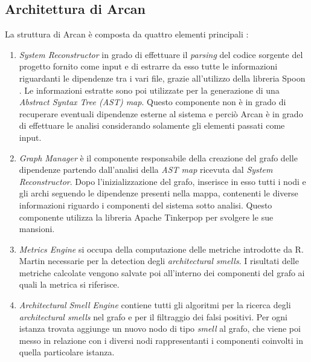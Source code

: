     \subsection{Architettura di Arcan}
        La struttura di Arcan è composta da quattro elementi principali \cite{Arcan2017}:
        \begin{enumerate}
            \item \textit{System Reconstructor} in grado di effettuare il \textit{parsing} del codice sorgente del progetto fornito come input e di estrarre da esso tutte le informazioni riguardanti le dipendenze tra i vari file, grazie all'utilizzo della libreria Spoon \cite{pawlak:hal-01169705}. Le informazioni estratte sono poi utilizzate per la generazione di una \textit{Abstract Syntax Tree (AST) map}. Questo componente non è in grado di recuperare eventuali dipendenze esterne al sistema e perciò Arcan è in grado di effettuare le analisi considerando solamente gli elementi passati come input.

            \item \textit{Graph Manager} è il componente responsabile della creazione del grafo delle dipendenze partendo dall'analisi della \textit{AST map} ricevuta dal \textit{System Reconstructor}. Dopo l'inizializzazione del grafo, inserisce in esso tutti i nodi e gli archi seguendo le dipendenze presenti nella mappa, contenenti le diverse informazioni riguardo i componenti del sistema sotto analisi. Questo componente utilizza la libreria Apache Tinkerpop \cite{ApahceTinkerpop} per svolgere le sue mansioni.
             
            \item \textit{Metrics Engine} si occupa della computazione delle metriche introdotte da R. Martin \cite{martin1994oometrics} necessarie per la detection degli \textit{architectural smells}. I risultati delle metriche calcolate vengono salvate poi all'interno dei componenti del grafo ai quali la metrica si riferisce.
            
            \item \textit{Architectural Smell Engine} contiene tutti gli algoritmi per la ricerca degli \textit{architectural smells} nel grafo e per il filtraggio dei falsi positivi. 
            Per ogni istanza trovata aggiunge un nuovo nodo di tipo \textit{smell} al grafo, che viene poi messo in relazione con i diversi nodi rappresentanti i componenti coinvolti in quella particolare istanza.
        \end{enumerate}
        
